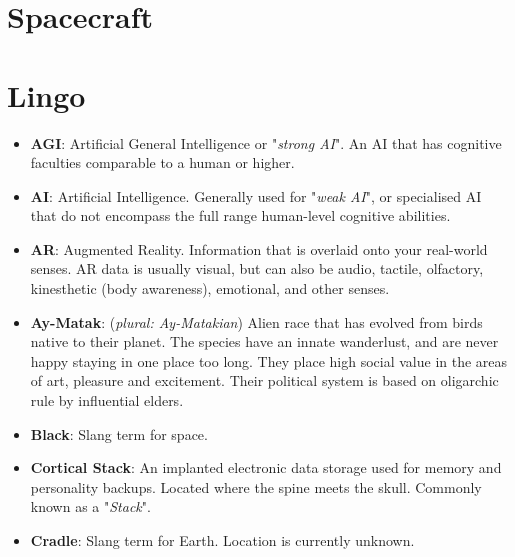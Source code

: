 \documentclass[10pt,twoside]{article}
\begin{document}
  \newpage


  \section{Spacecraft}

  \newpage


  \section{Lingo}

  \begin{multicols}{2}

  \begin{itemize}

    \item \textbf{AGI}: Artificial General Intelligence or "\textit{strong AI}". An AI that has cognitive faculties comparable to a human or higher.

    \item \textbf{AI}: Artificial Intelligence. Generally used for "\textit{weak AI}", or specialised AI that do not encompass the full range human-level cognitive abilities.

    \item \textbf{AR}: Augmented Reality. Information that is overlaid onto your real-world senses. AR data is usually visual, but can also be audio, tactile, olfactory, kinesthetic (body awareness), emotional, and other senses.

    \item \textbf{Ay-Matak}: (\textit{plural: Ay-Matakian}) Alien race that has evolved from birds native to their planet. The species have an innate wanderlust, and are never happy staying in one place too long. They place high social value in the areas of art, pleasure and excitement. Their political system is based on oligarchic rule by influential elders.

    \item \textbf{Black}: Slang term for space.

    \item \textbf{Cortical Stack}: An implanted electronic data storage used for memory and personality backups. Located where the spine meets the skull. Commonly known as a "\textit{Stack}".

    \item \textbf{Cradle}: Slang term for Earth. Location is currently unknown.


\end{itemize}
\end{multicols}
\end{document}
